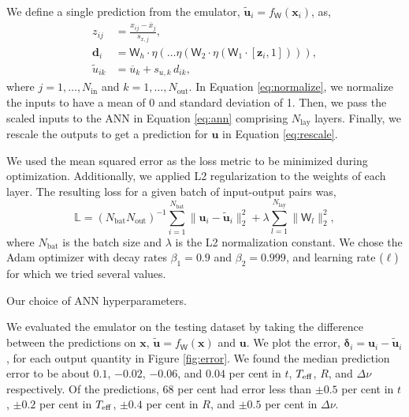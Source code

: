 \documentclass[fleqn,usenatbib]{mnras}
\renewcommand*{\vec}[1]{\boldsymbol{#1}}
\newcommand*{\mat}[1]{\boldsymbol{\mathsf{#1}}}
\newcommand{\inputs}{{x}}
\newcommand{\outputs}{{u}}
\newcommand{\pred}{{\tilde{\outputs}}}
\newcommand{\error}{{\delta}}
\newcommand{\teff}[1][]{{\ensuremath{T_{\mathrm{eff} \ifx#1\empty \else , #1 \fi}}}}
\begin{document}
We define a single prediction from the emulator, \(\vec\pred_i = f_{\mat W}(\vec\inputs_i)\), as,
%
\begin{align}
    z_{ij} &= \frac{\inputs_{ij} - \overline{\inputs}_j}{s_{\inputs,j}}, \label{eq:normalize}\\
    \vec d_i &= \mat W_h \cdot \eta ( \dots \eta ( \mat W_2 \cdot \eta ( \mat W_1 \cdot
        [\vec z_i, 1]
    ) ) ), \label{eq:ann}\\
    \pred_{ik} &= \overline{\outputs}_k + s_{\outputs,k} \, d_{ik}, \label{eq:rescale}
\end{align}
%
where \(j = 1, \dots, N_\mathrm{in}\) and \(k = 1, \dots, N_\mathrm{out}\). In Equation \ref{eq:normalize}, we normalize the inputs to have a mean of 0 and standard deviation of 1. Then, we pass the scaled inputs to the ANN in Equation \ref{eq:ann} comprising \(N_\mathrm{lay}\) layers. Finally, we rescale the outputs to get a prediction for \(\vec\outputs\) in Equation \ref{eq:rescale}.

We used the mean squared error as the loss metric to be minimized during optimization. Additionally, we applied L2 regularization to the weights of each layer. The resulting loss for a given batch of input-output pairs was,
%
\begin{equation}
    \mathbb{L} = (N_\mathrm{bat}N_\mathrm{out})^{-1} \sum_{i=1}^{N_\mathrm{bat}} \| \vec\outputs_i - \vec\pred_i \|_2^2 + \lambda \sum_{l=1}^{N_\mathrm{lay}} \| \mat W_l \|_2^2,
\end{equation} 
%
where \(N_\mathrm{bat}\) is the batch size and \(\lambda\) is the L2 normalization constant. We chose the Adam optimizer \citep{Kingma.Ba2014} with decay rates \(\beta_1=0.9\) and \(\beta_2 = 0.999\), and learning rate (\(\ell\)) for which we tried several values.

\begin{table}
    \centering
    \caption{Our choice of ANN hyperparameters.}
    
\end{table}

We evaluated the emulator on the testing dataset by taking the difference between the predictions on \(\vec\inputs\), \(\vec\pred = f_\mathsf{W}(\vec\inputs)\) and \(\vec\outputs\). We plot the error, \(\vec\error_i = \vec\outputs_i - \vec\pred_i\), for each output quantity in Figure \ref{fig:error}. We found the median prediction error to be about \(0.1\), \(-0.02\), \(-0.06\), and \(0.04\) per cent in \(t\), \(\teff\), \(R\), and \(\Delta\nu\) respectively. Of the predictions, 68 per cent had error less than \(\pm 0.5\) per cent in \(t\), \(\pm 0.2\) per cent in \(\teff\), \(\pm 0.4\) per cent in \(R\), and \(\pm 0.5\) per cent in \(\Delta\nu\).
\end{document}
